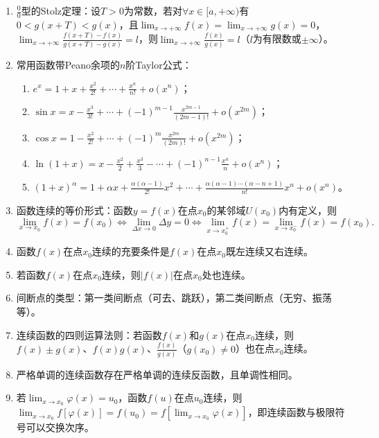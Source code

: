 \documentclass[UTF8]{ctexart}
\theoremstyle{remark}
\begin{document}
\begin{enumerate}
				\item $\frac{0}{0}$型的Stolz定理：设$T>0$为常数，若对$\forall x \in [a,+\infty)$有$0<g(x+T)<g(x)$，且$\lim_{x \to +\infty} f(x)=\lim_{x \to +\infty} g(x)=0$，$\lim_{x \to +\infty} \frac{f(x+T)-f(x)}{g(x+T)-g(x)}=l$，则$\lim_{x \to +\infty} \frac{f(x)}{g(x)}=l$（$l$为有限数或$\pm\infty$）。
				
				\item 常用函数带Peano余项的$n$阶Taylor公式：
				\begin{enumerate}
					\item $e^x = 1 + x + \frac{x^2}{2!} + \cdots + \frac{x^n}{n!} + o(x^n)$；
					\item $\sin x = x - \frac{x^3}{3!} + \cdots + (-1)^{m-1} \frac{x^{2m-1}}{(2m-1)!} + o(x^{2m})$；
					\item $\cos x = 1 - \frac{x^2}{2!} + \cdots + (-1)^m \frac{x^{2m}}{(2m)!} + o(x^{2m})$；
					\item $\ln(1+x) = x - \frac{x^2}{2} + \frac{x^3}{3} - \cdots + (-1)^{n-1} \frac{x^n}{n} + o(x^n)$；
					\item $(1+x)^\alpha = 1 + \alpha x + \frac{\alpha(\alpha-1)}{2!}x^2 + \cdots + \frac{\alpha(\alpha-1)\cdots(\alpha-n+1)}{n!}x^n + o(x^n)$。
				\end{enumerate}
				
				\item 函数连续的等价形式：函数$y=f(x)$在点$x_0$的某邻域$U(x_0)$内有定义，则
				\[
				\lim_{x \to x_0} f(x) = f(x_0) \Leftrightarrow \lim_{\Delta x \to 0} \Delta y = 0 \Leftrightarrow \lim_{x \to x_0^+} f(x) = \lim_{x \to x_0^-} f(x) = f(x_0).
				\]
				
				\item 函数$f(x)$在点$x_0$连续的充要条件是$f(x)$在点$x_0$既左连续又右连续。
				
				\item 若函数$f(x)$在点$x_0$连续，则$|f(x)|$在点$x_0$处也连续。
				
				\item 间断点的类型：第一类间断点（可去、跳跃），第二类间断点（无穷、振荡等）。
				
				\item 连续函数的四则运算法则：若函数$f(x)$和$g(x)$在点$x_0$连续，则$f(x) \pm g(x)$、$f(x)g(x)$、$\frac{f(x)}{g(x)}$（$g(x_0) \neq 0$）也在点$x_0$连续。
				
				\item 严格单调的连续函数存在严格单调的连续反函数，且单调性相同。
				
				\item 若$\lim_{x \to x_0} \varphi(x) = u_0$，函数$f(u)$在点$u_0$连续，则$\lim_{x \to x_0} f[\varphi(x)] = f(u_0) = f[\lim_{x \to x_0} \varphi(x)]$，即连续函数与极限符号可以交换次序。
				

\end{enumerate}
\end{document}

